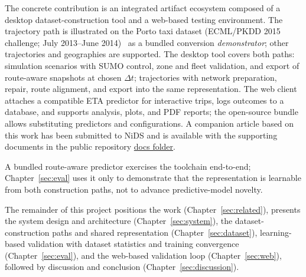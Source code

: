 The concrete contribution is an integrated artifact ecosystem composed of a desktop dataset-construction tool and a web-based testing environment.
The trajectory path is illustrated on the Porto taxi dataset (ECML/PKDD 2015 challenge; July 2013--June 2014)~\cite{porto2015pkdd} as a bundled conversion \emph{demonstrator}; other trajectories and geographies are supported. The desktop tool covers both paths: simulation scenarios with SUMO control, zone and fleet validation, and export of route-aware snapshots at chosen $\Delta t$; trajectories with network preparation, repair, route alignment, and export into the same representation. The web client attaches a compatible ETA predictor for interactive trips, logs outcomes to a database, and supports analysis, plots, and PDF reports; the open-source bundle allows substituting predictors and configurations. A companion article based on this work has been submitted to NiDS and is available with the supporting documents in the public repository \href{https://github.com/Turgibot/Multi-Variant-Simulated-Traffic-Dataset-Creator-and-Model-Tester/tree/master/docs}{docs folder}.

A bundled route-aware predictor exercises the toolchain end-to-end; Chapter~\ref{sec:eval} uses it only to demonstrate that the representation is learnable from both construction paths, not to advance predictive-model novelty.

The remainder of this project positions the work (Chapter~\ref{sec:related}), presents the system design and architecture (Chapter~\ref{sec:system}), the dataset-construction paths and shared representation (Chapter~\ref{sec:dataset}), learning-based validation with dataset statistics and training convergence (Chapter~\ref{sec:eval}), and the web-based validation loop (Chapter~\ref{sec:web}), followed by discussion and conclusion (Chapter~\ref{sec:discussion}).
